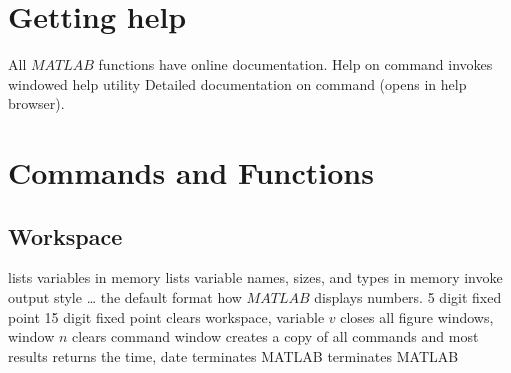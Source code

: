 
\def\content{\uppercase{MatLab}}
\def\shortcontent{\content}
\def\versionnumber{0.3}  %
\def\version{v\versionnumber\ \month\ \year}


\mytitle

\shortintro

\section{Getting help}{All $MATLAB$ functions have online documentation.}
	{Help on command}
	{invokes windowed help utility}
	{Detailed documentation on command (opens in help browser).}

\section{Commands and Functions}{}
\subsection{Workspace}{}
	{lists variables in memory}
	{lists variable names, sizes, and types in memory}
	{invoke output style \ldots}
	{the default format how $MATLAB$ displays numbers.}
	{5 digit fixed point}
	{15 digit fixed point}
	{clears workspace, variable $v$}
	{closes all figure windows, window $n$}
	{clears command window}
	{creates a copy of all commands and most results}
	{returns the time, date}
	{terminates MATLAB}
	{terminates MATLAB}

